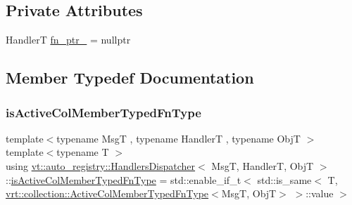 \subsection*{Private Attributes}
\begin{DoxyCompactItemize}
\item 
HandlerT \hyperlink{structvt_1_1auto__registry_1_1_handlers_dispatcher_a2ec99ef68e6c7b37f3e978a100cecb81}{fn\+\_\+ptr\+\_\+} = nullptr
\end{DoxyCompactItemize}


\subsection{Member Typedef Documentation}
\mbox{\label{structvt_1_1auto__registry_1_1_handlers_dispatcher_abb1fd9fbd94142c577699cc0066e279d}} 
\subsubsection{\texorpdfstring{is\+Active\+Col\+Member\+Typed\+Fn\+Type}{isActiveColMemberTypedFnType}}
{\footnotesize\ttfamily template$<$typename MsgT , typename HandlerT , typename ObjT $>$ \\
template$<$typename T $>$ \\
using \hyperlink{structvt_1_1auto__registry_1_1_handlers_dispatcher}{vt\+::auto\+\_\+registry\+::\+Handlers\+Dispatcher}$<$ MsgT, HandlerT, ObjT $>$\+::\hyperlink{structvt_1_1auto__registry_1_1_handlers_dispatcher_abb1fd9fbd94142c577699cc0066e279d}{is\+Active\+Col\+Member\+Typed\+Fn\+Type} =  std\+::enable\+\_\+if\+\_\+t$<$ std\+::is\+\_\+same$<$ T, \hyperlink{namespacevt_1_1vrt_1_1collection_a87925616c03cf4ccc548d33b2fe172ee}{vrt\+::collection\+::\+Active\+Col\+Member\+Typed\+Fn\+Type}$<$MsgT, ObjT$>$ $>$\+::value $>$\hspace{0.3cm}{\ttfamily [private]}}

\mbox{\label{structvt_1_1auto__registry_1_1_handlers_dispatcher_a1c50adc2b2f2ac67f9cc793cdddbf2f5}} 

